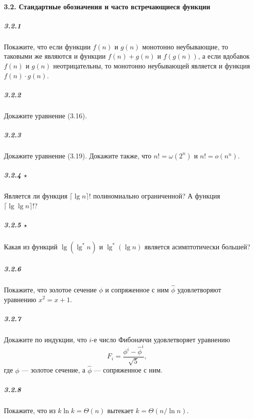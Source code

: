 \paragraph{3.2. Стандартные обозначения и часто встречающиеся функции}
\subparagraph*{3.2.1}
Покажите, что если функции $f(n)$ и $g(n)$ монотонно неубывающие, то таковыми же являются и функции $f(n) + g(n)$ и $f(g(n))$, а если вдобавок $f(n)$ и $g(n)$ неотрицательны, то монотонно неубывающей является и функция $f(n) \cdot g(n)$.

\subparagraph*{3.2.2}
Докажите уравнение (3.16).

\subparagraph*{3.2.3}
Докажите уравнение (3.19). Докажите также, что $n! = \omega(2^n)$ и $n! = o(n^n)$.

\subparagraph*{3.2.4 $\star$}
Является ли функция $\lceil \lg n \rceil!$ полиномиально ограниченной? А функция $\lceil \lg \lg n \rceil!$?

\subparagraph*{3.2.5 $\star$}
Какая из функций $\lg(\lg^* n)$ и $\lg^*(\lg n)$ является асимптотически большей?

\subparagraph*{3.2.6}
Покажите, что золотое сечение $\phi$ и сопряженное с ним $\hat{\phi}$ удовлетворяют уравнению $x^2 = x + 1$.

\subparagraph*{3.2.7}
Докажите по индукции, что $i$-е число Фибоначчи удовлетворяет уравнению
\[ F_i = \frac{\phi^i - \hat{\phi}^i}{\sqrt{5}}, \]
где $\phi$ — золотое сечение, а $\hat{\phi}$ — сопряженное с ним.

\subparagraph*{3.2.8}
Покажите, что из $k \ln k = \Theta(n)$ вытекает $k = \Theta(n / \ln n)$.
